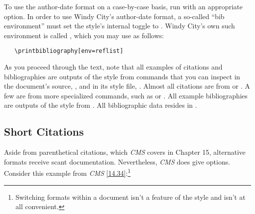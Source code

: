 \documentclass[11pt,letterpaper,oneside]{article}
\begin{document}
To use the author-date format on a case-by-case basis, run
 with an appropriate  option. In order
to use Windy City's author-date format, a so-called ``bib
environment'' must set the style's internal  toggle to
. Windy City's own such environment is called ,
which you may use as follows:

\begin{verbatim}
   \printbibliography[env=reflist]
\end{verbatim}

As you proceed through the text, note that all examples of citations
and bibliographies are outputs of the style from commands that you can
inspect in the document's source, , and in its
style file, . Almost all citations are from
 or . A few are from more specialized
commands, such as  or . All example
bibliographies are outputs of the style from .
All bibliographic data resides in .

\subsection{Short Citations}
\label{short}

Aside from parenthetical citations, which \textit{CMS} covers in
Chapter 15, alternative formats receive scant documentation.
Nevertheless, \textit{CMS} does give options. Consider this example
from \textit{CMS} \ref{14.34}:\footnote{Switching formats within a
document isn't a feature of the style and isn't at all convenient.}

\begin{citeonly}
\item \cite[3]{morrison2004a}
\item \cite[18]{morrison2004a}
\item \cite[18]{morrison2004a}
\item \cite[24--26]{morrison2004a}
\item \cite[401-2]{morrison2004b}
\item \cite[433]{morrison2004b}
\item \cite[37--38]{diaz2008}
\item \cite[403]{morrison2004b}
\item \cite[152]{diaz2008}
\item \cite[201-2]{diaz2008}
\item \cites[240]{morrison2004b}[32]{morrison2004a}
\item \cite[33]{morrison2004a}
\end{citeonly}
\end{document}
